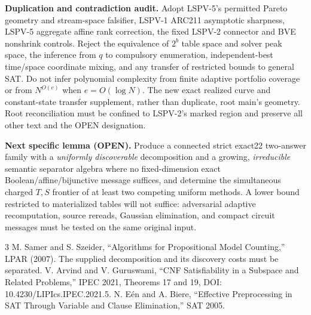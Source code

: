 \documentclass[10pt]{article}
\begin{document}
\noindent\textbf{Duplication and contradiction audit.} Adopt LSPV-5's permitted Pareto geometry and stream-space falsifier, LSPV-1 ARC211 asymptotic sharpness, LSPV-5 aggregate affine rank correction, the fixed LSPV-2 connector and BVE nonshrink controls. Reject the equivalence of $2^b$ table space and solver peak space, the inference from $q$ to compulsory enumeration, independent-best time/space coordinate mixing, and any transfer of restricted bounds to general SAT. Do not infer polynomial complexity from finite adaptive portfolio coverage or from $N^{O(e)}$ when $e=O(\log N)$. The new exact realized curve and constant-state transfer supplement, rather than duplicate, root main's geometry. Root reconciliation must be confined to LSPV-2's marked region and preserve all other text and the OPEN designation.

\noindent\textbf{Next specific lemma (OPEN).} Produce a connected strict exact22 two-answer family with a \emph{uniformly discoverable} decomposition and a growing, \emph{irreducible} semantic separator algebra where no fixed-dimension exact Boolean/affine/bijunctive message suffices, and determine the simultaneous charged $T,S$ frontier of at least two competing uniform methods. A lower bound restricted to materialized tables will not suffice: adversarial adaptive recomputation, source rereads, Gaussian elimination, and compact circuit messages must be tested on the same original input.

\begin{thebibliography}{3}
 M. Samer and S. Szeider, ``Algorithms for Propositional Model Counting,'' LPAR (2007). The supplied decomposition and its discovery costs must be separated.
 V. Arvind and V. Guruswami, ``CNF Satisfiability in a Subspace and Related Problems,'' IPEC 2021, Theorems 17 and 19, DOI: 10.4230/LIPIcs.IPEC.2021.5.
 N. E\'en and A. Biere, ``Effective Preprocessing in SAT Through Variable and Clause Elimination,'' SAT 2005.
\end{thebibliography}
\end{document}
